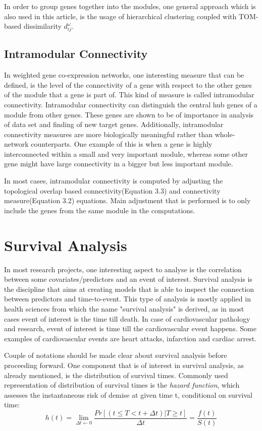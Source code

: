 \documentclass{ba-kecs}
\numberwithin{figure}{section}
\numberwithin{equation}{section}
\begin{document}
In order to group genes together into the modules, one general approach which is also used in this article, is the usage of hierarchical clustering coupled with TOM-based dissimilarity $d^{\omega}_{ij}$.


\subsection{Intramodular Connectivity}

In weighted gene co-expression networks, one interesting measure that can be defined, is the level of the connectivity of a gene with respect to the other genes of the module that a gene is part of. This kind of measure is called intramodular connectivity. Intramodular connectivity can distinguish the central hub genes of a module from other genes. These genes are shown to be of importance in analysis of data set and finding of new target genes. Additionally, intramodular connectivity measures are more biologically meaningful rather than whole-network counterparts. One example of this is when a gene is highly interconnected within a small and very important module, whereas some other gene might have large connectivity in a bigger but less important module.

In most cases, intramodular connectivity is computed by adjusting the topological overlap based connectivity(Equation 3.3) and connectivity measure(Equation 3.2) equations. Main adjustment that is performed is to only include the genes from the same module in the computations.

\section{Survival Analysis}
In most research projects, one interesting aspect to analyse is the correlation between some covariates/predictors and an event of interest. Survival analysis is the discipline that aims at creating models that is able to inspect the connection between predictors and time-to-event. This type of analysis is mostly applied in health sciences from which the name "survival analysis" is derived, as in most cases event of interest is the time till death. In case of cardiovascular pathology and research, event of interest is time till the cardiovascular event happens. Some examples of cardiovascular events are heart attacks, infarction and cardiac arrest.

Couple of notations should be made clear about survival analysis before proceeding forward. One component that is of interest in survival analysis, as already mentioned, is the distribution of survival times. Commonly used representation of distribution of survival times is the \textit{hazard function}, which assesses the instantaneous risk of demise at given time t, conditional on survival time:
\begin{equation}
h(t) = \lim_{\Delta{t} \leftarrow 0} \dfrac{Pr[(t \leq T < t + \Delta{t})|T \geq t]}{\Delta{t}} = \dfrac{f(t)}{S(t)}
\end{equation}
\end{document}
